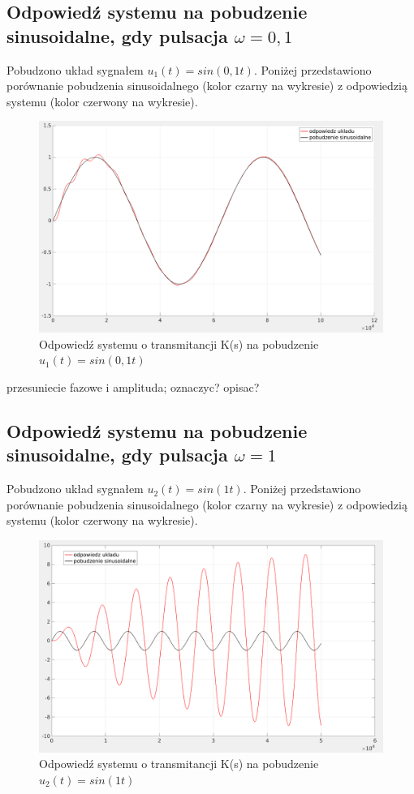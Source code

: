 \documentclass[12pt]{article}
\begin{document}
\subsection{Odpowiedź systemu na pobudzenie sinusoidalne, gdy pulsacja $\omega = 0,1$}
Pobudzono układ sygnałem $u_1(t)=sin(0,1 t)$. Poniżej przedstawiono porównanie pobudzenia sinusoidalnego (kolor czarny na wykresie) z odpowiedzią systemu (kolor czerwony na wykresie).
\begin{figure}[H]
    \centering
    \includegraphics[scale=0.2]{2.1.png}
    \caption{Odpowiedź systemu o transmitancji K(s) na pobudzenie $u_1(t)=sin(0,1 t)$}
\end{figure}

\colorbox{Dandelion}{przesuniecie fazowe i amplituda; oznaczyc? opisac?}

\subsection{Odpowiedź systemu na pobudzenie sinusoidalne, gdy pulsacja $\omega = 1$}
Pobudzono układ sygnałem $u_2(t)=sin(1 t)$. Poniżej przedstawiono porównanie pobudzenia sinusoidalnego (kolor czarny na wykresie) z odpowiedzią systemu (kolor czerwony na wykresie).
\begin{figure}[H]
    \centering
    \includegraphics[scale=0.2]{2.2.png}
    \caption{Odpowiedź systemu o transmitancji K(s) na pobudzenie $u_2(t)=sin(1 t)$}
\end{figure}
\end{document}
